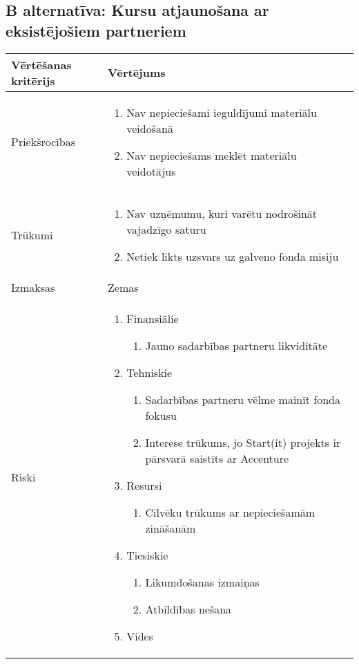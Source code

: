 \subsection*{B alternatīva: Kursu atjaunošana ar eksistējošiem partneriem}
\begin{table}[!ht]
    \centering
    \begin{tabular}{|l|p{11.5cm}|}
        \hline
        \textbf{Vērtēšanas kritērijs} & \textbf{Vērtējums} \\
        \hline
        Priekšrocības & \begin{enumerate}
            \item Nav nepieciešami ieguldījumi materiālu veidošanā
            \item Nav nepieciešams meklēt materiālu veidotājus
        \end{enumerate} \\
        \hline 
        Trūkumi &  \begin{enumerate}
            \item Nav uzņēmumu, kuri varētu nodrošināt vajadzīgo saturu
            \item Netiek likts uzsvars uz galveno fonda misiju
        \end{enumerate}\\
        \hline 
        Izmaksas & Zemas \\
        \hline
        Riski &  \begin{enumerate}
            \item Finansiālie
            \begin{enumerate}
                \item Jauno sadarbības partneru likviditāte
            \end{enumerate}
            \item Tehniskie
            \begin{enumerate}
                \item Sadarbības partneru vēlme mainīt fonda fokusu
                \item Interese trūkums, jo Start(it) projekts ir pārsvarā saistīts ar Accenture
            \end{enumerate}
            \item Resursi
            \begin{enumerate}
                \item Cilvēku trūkums ar nepieciešamām zināšanām
            \end{enumerate}
            \item Tiesiskie
            \begin{enumerate}
                \item Likumdošanas izmaiņas
                \item Atbildības nešana
            \end{enumerate}
            \item Vides
        \end{enumerate}\\
        \hline
    \end{tabular}
\end{table}
\clearpage

